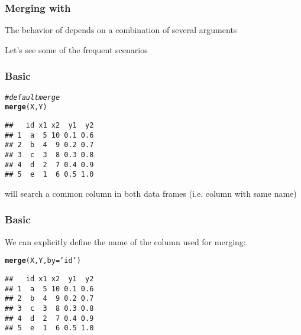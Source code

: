 \documentclass[12pt]{beamer}\usepackage[]{graphicx}\usepackage[]{color}
\makeatletter
\newcommand{\hlstr}[1]{\textcolor[rgb]{0.192,0.494,0.8}{#1}}%
\newcommand{\hlcom}[1]{\textcolor[rgb]{0.678,0.584,0.686}{\textit{#1}}}%
\newcommand{\hlstd}[1]{\textcolor[rgb]{0.345,0.345,0.345}{#1}}%
\newcommand{\hlkwc}[1]{\textcolor[rgb]{0.333,0.667,0.333}{#1}}%
\newcommand{\hlkwd}[1]{\textcolor[rgb]{0.737,0.353,0.396}{\textbf{#1}}}%
\newenvironment{kframe}{%
 \def\at@end@of@kframe{}%
 \ifinner\ifhmode%
  \def\at@end@of@kframe{\end{minipage}}%
  \begin{minipage}{\columnwidth}%
 \fi\fi%
 \def\FrameCommand##1{\hskip\@totalleftmargin \hskip-\fboxsep
 \colorbox{shadecolor}{##1}\hskip-\fboxsep
     \hskip-\linewidth \hskip-\@totalleftmargin \hskip\columnwidth}%
 \MakeFramed {\advance\hsize-\width
   \@totalleftmargin\z@ \linewidth\hsize
   \@setminipage}}%
 {\par\unskip\endMakeFramed%
 \at@end@of@kframe}
\newenvironment{knitrout}{}{} %
\makeatother
\begin{document}

\begin{frame}[fragile]
\frametitle{Merging with }

\bbi
  \item The behavior of  depends on a combination of several arguments
  \item Let's see some of the frequent scenarios
\ei

\end{frame}


\begin{frame}[fragile]
\frametitle{Basic }

\begin{knitrout}\footnotesize
{}\color{fgcolor}\begin{kframe}
\begin{alltt}
\hlcom{# default merge}
\hlkwd{merge}\hlstd{(X, Y)}
\end{alltt}
\begin{verbatim}
##   id x1 x2  y1  y2
## 1  a  5 10 0.1 0.6
## 2  b  4  9 0.2 0.7
## 3  c  3  8 0.3 0.8
## 4  d  2  7 0.4 0.9
## 5  e  1  6 0.5 1.0
\end{verbatim}
\end{kframe}
\end{knitrout}

 will search a common column in both data frames (i.e. column with same name)

\end{frame}


\begin{frame}[fragile]
\frametitle{Basic }

We can explicitly define the name of the column used for merging:
\begin{knitrout}\footnotesize
{}\color{fgcolor}\begin{kframe}
\begin{alltt}
\hlkwd{merge}\hlstd{(X, Y,} \hlkwc{by} \hlstd{=} \hlstr{'id'}\hlstd{)}
\end{alltt}
\begin{verbatim}
##   id x1 x2  y1  y2
## 1  a  5 10 0.1 0.6
## 2  b  4  9 0.2 0.7
## 3  c  3  8 0.3 0.8
## 4  d  2  7 0.4 0.9
## 5  e  1  6 0.5 1.0
\end{verbatim}
\end{kframe}
\end{knitrout}

\end{frame}
\end{document}

